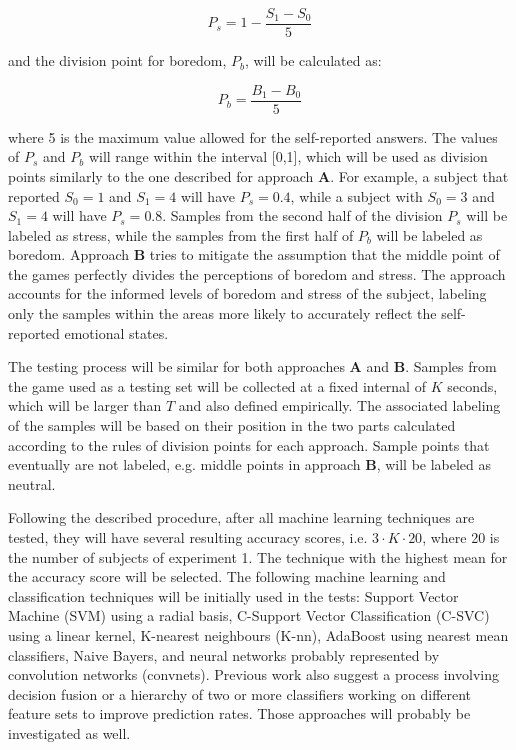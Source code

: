 \begin{equation}
P_s = 1 - \frac{S_1 - S_0}{5}
\end{equation}

and the division point for boredom, $P_b$, will be calculated as:

\begin{equation}
P_b = \frac{B_1 - B_0}{5}
\end{equation}

where 5 is the maximum value allowed for the self-reported answers. The values of $P_s$ and $P_b$ will range within the interval [0,1], which will be used as division points similarly to the one described for approach \textbf{A}. For example, a subject that reported $S_0=1$ and $S_1=4$ will have $P_s=0.4$, while a subject with $S_0=3$ and $S_1=4$ will have $P_s=0.8$. Samples from the second half of the division $P_s$ will be labeled as stress, while the samples from the first half of $P_b$ will be labeled as boredom. Approach \textbf{B} tries to mitigate the assumption that the middle point of the games perfectly divides the perceptions of boredom and stress. The approach accounts for the informed levels of boredom and stress of the subject, labeling only the samples within the areas more likely to accurately reflect the self-reported emotional states.

The testing process will be similar for both approaches \textbf{A} and \textbf{B}. Samples from the game used as a testing set will be collected at a fixed internal of $K$ seconds, which will be larger than $T$ and also defined empirically. The associated labeling of the samples will be based on their position in the two parts calculated according to the rules of division points for each approach. Sample points that eventually are not labeled, e.g. middle points in approach \textbf{B}, will be labeled as neutral.

Following the described procedure, after all machine learning techniques are tested, they will have several resulting accuracy scores, i.e. $3 \cdot K \cdot 20$, where 20 is the number of subjects of experiment 1. The technique with the highest mean for the accuracy score will be selected. The following machine learning and classification techniques will be initially used in the tests: Support Vector Machine (SVM) using a radial basis, C-Support Vector Classification (C-SVC) using a linear kernel, K-nearest neighbours (K-nn), AdaBoost using nearest mean classifiers, Naive Bayers, and neural networks probably represented by convolution networks (convnets). Previous work also suggest a process involving decision fusion or a hierarchy of two or more classifiers working on different feature sets to improve prediction rates. Those approaches will probably be investigated as well.

